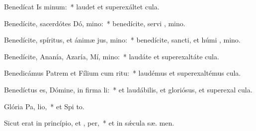 \item Benedícat Is minum:~* laudet et superexáltet   cula.
\item Benedícite, sacerdótes Dó, mino:~* benedícite, servi , mino.
\item Benedícite, spíritus, et ánimæ jus, mino:~* benedícite, sancti, et húmi , mino.
\item Benedícite, Ananía, Azaría, Mí, mino:~* laudáte et superexaltáte   cula.
\item Benedicámus Patrem et Fílium cum  ritu:~* laudémus et superexaltémus   cula.
\item Benedíctus es, Dómine, in firma li:~* et laudábilis, et gloriósus, et superexal  cula.
\item Glória Pa,  lio,~* et Spi to.
\item Sicut erat in princípio, et ,  per,~* et in sǽcula sæ. men.
